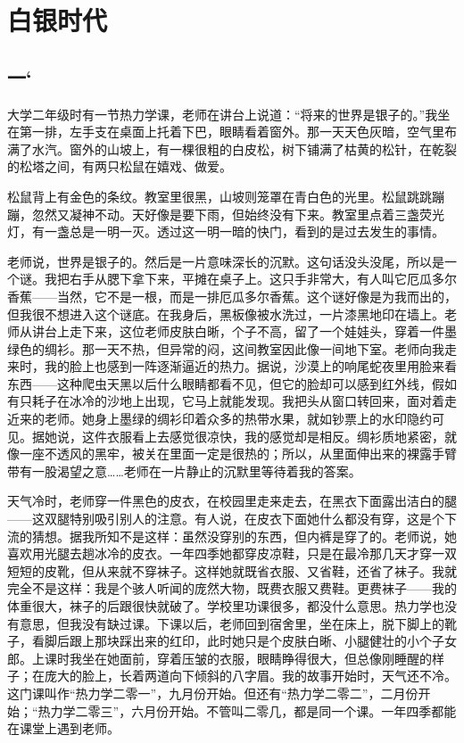 \chapter{白银时代}

\section*{一`}

大学二年级时有一节热力学课，老师在讲台上说道：“将来的世界是银子的。”我坐在第一排，左手支在桌面上托着下巴，眼睛看着窗外。那一天天色灰暗，空气里布满了水汽。窗外的山坡上，有一棵很粗的白皮松，树下铺满了枯黄的松针，在乾裂的松塔之间，有两只松鼠在嬉戏、做爱。 

松鼠背上有金色的条纹。教室里很黑，山坡则笼罩在青白色的光里。松鼠跳跳蹦蹦，忽然又凝神不动。天好像是要下雨，但始终没有下来。教室里点着三盏荧光灯，有一盏总是一明一灭。透过这一明一暗的快门，看到的是过去发生的事情。 

老师说，世界是银子的。然后是一片意味深长的沉默。这句话没头没尾，所以是一个谜。我把右手从腮下拿下来，平摊在桌子上。这只手非常大，有人叫它厄瓜多尔香蕉——当然，它不是一根，而是一排厄瓜多尔香蕉。这个谜好像是为我而出的，但我很不想进入这个谜底。在我身后，黑板像被水洗过，一片漆黑地印在墙上。老师从讲台上走下来，这位老师皮肤白晰，个子不高，留了一个娃娃头，穿着一件墨绿色的绸衫。那一天不热，但异常的闷，这间教室因此像一间地下室。老师向我走来时，我的脸上也感到一阵逐渐逼近的热力。据说，沙漠上的响尾蛇夜里用脸来看东西——这种爬虫天黑以后什么眼睛都看不见，但它的脸却可以感到红外线，假如有只耗子在冰冷的沙地上出现，它马上就能发现。我把头从窗口转回来，面对着走近来的老师。她身上墨绿的绸衫印着众多的热带水果，就如钞票上的水印隐约可见。据她说，这件衣服看上去感觉很凉快，我的感觉却是相反。绸衫质地紧密，就像一座不透风的黑牢，被关在里面一定是很热的；所以，从里面伸出来的裸露手臂带有一股渴望之意……老师在一片静止的沉默里等待着我的答案。 

天气冷时，老师穿一件黑色的皮衣，在校园里走来走去，在黑衣下面露出洁白的腿——这双腿特别吸引别人的注意。有人说，在皮衣下面她什么都没有穿，这是个下流的猜想。据我所知不是这样：虽然没穿别的东西，但内裤是穿了的。老师说，她喜欢用光腿去趟冰冷的皮衣。一年四季她都穿皮凉鞋，只是在最冷那几天才穿一双短短的皮靴，但从来就不穿袜子。这样她就既省衣服、又省鞋，还省了袜子。我就完全不是这样：我是个骇人听闻的庞然大物，既费衣服又费鞋。更费袜子——我的体重很大，袜子的后跟很快就破了。学校里功课很多，都没什么意思。热力学也没有意思，但我没有缺过课。下课以后，老师回到宿舍里，坐在床上，脱下脚上的靴子，看脚后跟上那块踩出来的红印，此时她只是个皮肤白晰、小腿健壮的小个子女郎。上课时我坐在她面前，穿着压皱的衣服，眼睛睁得很大，但总像刚睡醒的样子；在庞大的脸上，长着两道向下倾斜的八字眉。我的故事开始时，天气还不冷。这门课叫作“热力学二零一”，九月份开始。但还有“热力学二零二”，二月份开始；“热力学二零三”，六月份开始。不管叫二零几，都是同一个课。一年四季都能在课堂上遇到老师。 

